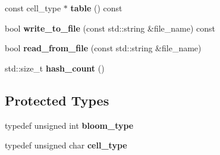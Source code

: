 \begin{DoxyCompactItemize}
\item 
\hypertarget{classstrtk_1_1bloom_1_1filter_a35412b17f0e8f67df4cb45948ed04892}{const cell\-\_\-type $\ast$ {\bfseries table} () const }\label{classstrtk_1_1bloom_1_1filter_a35412b17f0e8f67df4cb45948ed04892}

\item 
\hypertarget{classstrtk_1_1bloom_1_1filter_a464d7a8d335ac4f6c33ea56cabbe5fb9}{bool {\bfseries write\-\_\-to\-\_\-file} (const std\-::string \&file\-\_\-name) const }\label{classstrtk_1_1bloom_1_1filter_a464d7a8d335ac4f6c33ea56cabbe5fb9}

\item 
\hypertarget{classstrtk_1_1bloom_1_1filter_ace6e731b6e8caefb14770087cce2ca52}{bool {\bfseries read\-\_\-from\-\_\-file} (const std\-::string \&file\-\_\-name)}\label{classstrtk_1_1bloom_1_1filter_ace6e731b6e8caefb14770087cce2ca52}

\item 
\hypertarget{classstrtk_1_1bloom_1_1filter_adbbb839e64567879288981e34f37bae4}{std\-::size\-\_\-t {\bfseries hash\-\_\-count} ()}\label{classstrtk_1_1bloom_1_1filter_adbbb839e64567879288981e34f37bae4}

\end{DoxyCompactItemize}
\subsection*{Protected Types}
\begin{DoxyCompactItemize}
\item 
\hypertarget{classstrtk_1_1bloom_1_1filter_a1b78a2987ff5657faf0a729bcb1c8f3a}{typedef unsigned int {\bfseries bloom\-\_\-type}}\label{classstrtk_1_1bloom_1_1filter_a1b78a2987ff5657faf0a729bcb1c8f3a}

\item 
\hypertarget{classstrtk_1_1bloom_1_1filter_aa937c83c9315bd79e25a03b2cca68e4f}{typedef unsigned char {\bfseries cell\-\_\-type}}\label{classstrtk_1_1bloom_1_1filter_aa937c83c9315bd79e25a03b2cca68e4f}

\end{DoxyCompactItemize}
